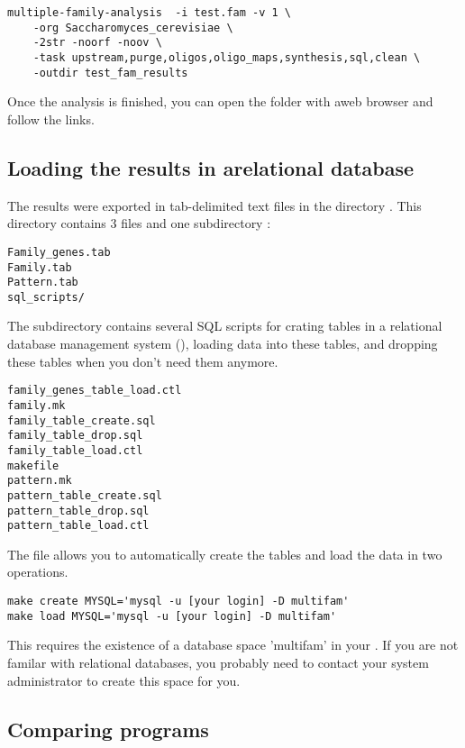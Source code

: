 \begin{verbatim}
multiple-family-analysis  -i test.fam -v 1 \
    -org Saccharomyces_cerevisiae \
    -2str -noorf -noov \
    -task upstream,purge,oligos,oligo_maps,synthesis,sql,clean \
    -outdir test_fam_results
\end{verbatim}

Once the analysis is finished, you can open the folder
\file{synthetic\_tables} with aweb browser and follow the links.

\subsection{Loading the results in arelational database}

The results were exported in tab-delimited text files in the directory
. This directory contains 3 files
and one subdirectory :

\begin{verbatim}
Family_genes.tab
Family.tab
Pattern.tab
sql_scripts/
\end{verbatim}

The subdirectory  contains several SQL scripts for crating
tables in a relational database management system (),
loading data into these tables, and dropping these tables when you
don't need them anymore.

\begin{verbatim}
family_genes_table_load.ctl
family.mk
family_table_create.sql
family_table_drop.sql
family_table_load.ctl
makefile
pattern.mk
pattern_table_create.sql
pattern_table_drop.sql
pattern_table_load.ctl
\end{verbatim}

The file  allows you to automatically create the tables
and load the data in two operations.

\begin{verbatim}
make create MYSQL='mysql -u [your login] -D multifam'
make load MYSQL='mysql -u [your login] -D multifam'
\end{verbatim}

This requires the existence of a database space 'multifam' in your
\concept{RDBMS}. If you are not familar with relational databases, you
probably need to contact your system administrator to create this
space for you.


\subsection{Comparing programs}


